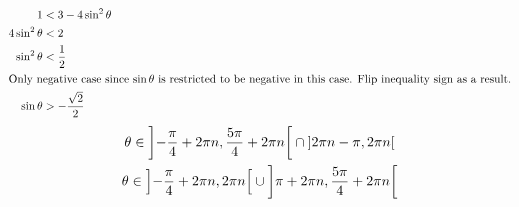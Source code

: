 \documentclass{article}
\begin{document}
\begin{minipage}[t]{.5\textwidth}
	\begin{align*}
		1&<3-4\sin^2\theta \\
		4\sin^2\theta&<2 \\
		\sin^2\theta&<\frac{1}{2} \\
		\intertext{Only negative case since $\sin\theta$ is
		restricted to be negative in this case. Flip
		inequality sign as a result.}
		\sin\theta&>-\frac{\sqrt{2}}{2}
	\end{align*}
	\begin{gather*}
		\theta\in\interval[scaled,open left,open right]
		{-\frac{\pi}{4}+2\pi n}{\frac{5\pi}{4}+2\pi n}
		\cap\interval[scaled,open left,open right]
		{2\pi n-\pi}{2\pi n} \\
		\theta\in\interval[scaled,open left,open right]
		{-\frac{\pi}{4}+2\pi n}{2\pi n}\cup\interval
		[scaled,open left,open right]{\pi+2\pi n}
		{\frac{5\pi}{4}+2\pi n}
	\end{gather*}
	\vfill\null\pagebreak
\end{minipage}
\end{document}
